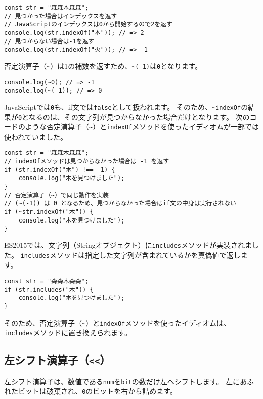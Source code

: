 \begin{lstlisting}
const str = "森森本森森";
// 見つかった場合はインデックスを返す
// JavaScriptのインデックスは0から開始するので2を返す
console.log(str.indexOf("本")); // => 2
// 見つからない場合は-1を返す
console.log(str.indexOf("火")); // => -1
\end{lstlisting}

否定演算子（\lstinline{~}）は1の補数を返すため、\lstinline{~(-1)}は\texttt{0}となります。

\begin{lstlisting}
console.log(~0); // => -1
console.log(~(-1)); // => 0
\end{lstlisting}

JavaScriptでは\texttt{0}も、if文では\texttt{false}として扱われます。
そのため、\lstinline{~indexOf}の結果が\texttt{0}となるのは、その文字列が見つからなかった場合だけとなります。
次のコードのような否定演算子（\lstinline{~}）と\texttt{indexOf}メソッドを使ったイディオムが一部では使われていました。

\begin{lstlisting}
const str = "森森木森森";
// indexOfメソッドは見つからなかった場合は -1 を返す
if (str.indexOf("木") !== -1) {
    console.log("木を見つけました");
}
// 否定演算子（~）で同じ動作を実装
// (~(-1)) は 0 となるため、見つからなかった場合はif文の中身は実行されない
if (~str.indexOf("木")) {
    console.log("木を見つけました");
}
\end{lstlisting}

ES2015では、文字列（Stringオブジェクト）に\texttt{includes}メソッドが実装されました。
\texttt{includes}メソッドは指定した文字列が含まれているかを真偽値で返します。

\begin{lstlisting}
const str = "森森木森森";
if (str.includes("木")) {
    console.log("木を見つけました");
}
\end{lstlisting}

そのため、否定演算子（\lstinline{~}）と\texttt{indexOf}メソッドを使ったイディオムは、\texttt{includes}メソッドに置き換えられます。

\hypertarget{left-shift}{%
\subsection{\texorpdfstring{左シフト演算子（\texttt{\textless{}\textless{}}）}{左シフト演算子（\textless{}\textless{}）}}\label{left-shift}}

左シフト演算子は、数値である\texttt{num}を\texttt{bit}の数だけ左へシフトします。
左にあふれたビットは破棄され、\texttt{0}のビットを右から詰めます。

